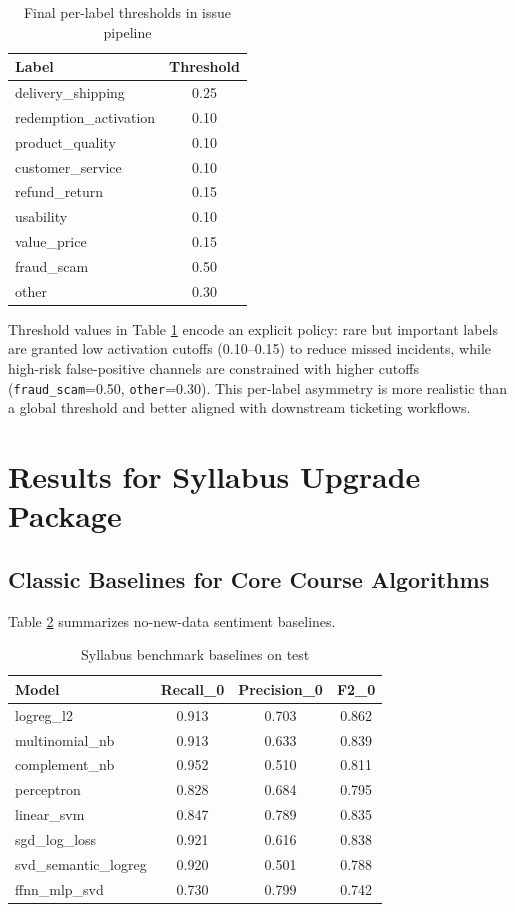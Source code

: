 \documentclass[12pt,a4paper]{article}
\begin{document}
\begin{table}[H]
\centering
\caption{Final per-label thresholds in issue pipeline}
\label{tab:issue_thresholds}
\begin{tabular}{lc}
\toprule
Label & Threshold \\
\midrule
delivery\_shipping & 0.25 \\
redemption\_activation & 0.10 \\
product\_quality & 0.10 \\
customer\_service & 0.10 \\
refund\_return & 0.15 \\
usability & 0.10 \\
value\_price & 0.15 \\
fraud\_scam & 0.50 \\
other & 0.30 \\
\bottomrule
\end{tabular}
\end{table}

Threshold values in Table \ref{tab:issue_thresholds} encode an explicit policy: rare but important labels are granted low activation cutoffs (0.10--0.15) to reduce missed incidents, while high-risk false-positive channels are constrained with higher cutoffs (\texttt{fraud\_scam}=0.50, \texttt{other}=0.30). This per-label asymmetry is more realistic than a global threshold and better aligned with downstream ticketing workflows.

\section{Results for Syllabus Upgrade Package}
\subsection{Classic Baselines for Core Course Algorithms}
Table \ref{tab:syllabus_baselines} summarizes no-new-data sentiment baselines.

\begin{table}[H]
\centering
\caption{Syllabus benchmark baselines on test}
\label{tab:syllabus_baselines}
\begin{tabular}{lccc}
\toprule
Model & Recall\_0 & Precision\_0 & F2\_0 \\
\midrule
logreg\_l2 & 0.913 & 0.703 & 0.862 \\
multinomial\_nb & 0.913 & 0.633 & 0.839 \\
complement\_nb & 0.952 & 0.510 & 0.811 \\
perceptron & 0.828 & 0.684 & 0.795 \\
linear\_svm & 0.847 & 0.789 & 0.835 \\
sgd\_log\_loss & 0.921 & 0.616 & 0.838 \\
svd\_semantic\_logreg & 0.920 & 0.501 & 0.788 \\
ffnn\_mlp\_svd & 0.730 & 0.799 & 0.742 \\
\bottomrule
\end{tabular}
\end{table}
\end{document}
